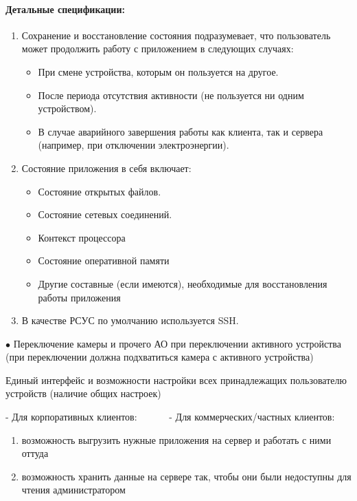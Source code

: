 \paragraph*{Детальные спецификации:}
\begin{enumerate}[label={\bfseries ДС-\arabic*}]
   \item Сохранение и восстановление состояния подразумевает, что пользователь может продолжить работу с приложением в следующих случаях:
         \begin{itemize}
            \item При смене устройства, которым он пользуется на другое.
            \item После периода отсутствия активности (не пользуется ни одним устройством).
            \item В случае аварийного завершения работы как клиента, так и сервера (например, при отключении электроэнергии).
         \end{itemize}
         \label{DS-appstate_switch}
   \item Состояние приложения в себя включает:
   \begin{itemize}
      \item Состояние открытых файлов.
      \item Состояние сетевых соединений.
      \item Контекст процессора
      \item Состояние оперативной памяти
      \item Другие составные (если имеются), необходимые для восстановления работы приложения
   \end{itemize}
   \item В качестве РСУС по умолчанию используется SSH. \label{DS-remote_access_default}
\end{enumerate}

\(\bullet\) Переключение камеры и прочего АО при переключении активного устройства (при переключении должна подхватиться камера с активного устройства)

Единый интерфейс и возможности настройки всех принадлежащих пользователю устройств (наличие общих настроек)

- Для корпоративных клиентов:
~~~~~~- Для коммерческих/частных клиентов:
\begin{enumerate}[label*={\bfseries\arabic*}]
   \item возможность выгрузить нужные приложения на сервер и работать с ними оттуда
   \item возможность хранить данные на сервере так, чтобы они были недоступны для чтения администратором
\end{enumerate}
